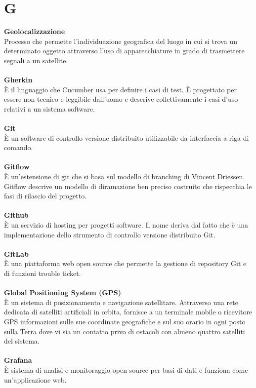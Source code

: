 \section{G}
\textbf{Geolocalizzazione}\\
Processo che permette l'individuazione geografica del luogo in cui si trova un determinato oggetto attraverso l'uso di apparecchiature in grado di trasmettere segnali a un satellite. \\ \\
\textbf{Gherkin}\\
È il linguaggio che Cucumber usa per definire i casi di test. È progettato per essere non tecnico e leggibile dall'uomo e descrive collettivamente i casi d'uso relativi a un sistema software. \\ \\
\textbf{Git}\\
È un software di controllo versione distribuito utilizzabile da interfaccia a riga di comando. \\ \\
\textbf{Gitflow}\\
È un’estensione di git che si basa sul modello di branching di Vincent Driessen. Gitflow descrive un modello di diramazione ben preciso costruito che rispecchia le fasi di rilascio del progetto.\\ \\
\textbf{Github}\\
È un servizio di hosting per progetti software. Il nome deriva dal fatto che è una implementazione dello strumento di controllo versione distribuito Git. \\ \\
\textbf{GitLab}\\
È una piattaforma web open source che permette la gestione di repository Git e di funzioni trouble ticket. \\ \\
\textbf{Global Positioning System (GPS)}\\
È un sistema di posizionamento e navigazione satellitare. Attraverso una rete dedicata di satelliti artificiali in orbita, fornisce a un terminale mobile o ricevitore GPS informazioni sulle sue coordinate geografiche e sul suo orario in ogni posto sulla Terra dove vi sia un contatto privo di ostacoli con almeno quattro satelliti del sistema. \\ \\
\textbf{Grafana}\\
È sistema di analisi e monitoraggio open source per basi di dati e funziona come un'applicazione web. \\ \\
\clearpage